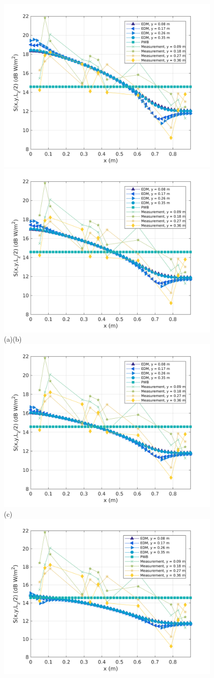 \documentclass[a4paper]{article}
\numberwithin{equation}{section}
\begin{document}
\begin{figure}[hp]
\begin{center}
\includegraphics[width=0.49\linewidth]{figures/SDM_3D_SL_PowerDensityProfileXMeas_JX_k0_5}
\includegraphics[width=0.49\linewidth]{figures/SDM_3D_SL_PowerDensityProfileXMeas_JX_k0_75}\\
{\footnotesize (a)\hspace{75mm}(b)}\\
\includegraphics[width=0.5\linewidth]{figures/SDM_3D_SL_PowerDensityProfileXMeas_JX_k1_0}\\
{\footnotesize (c)}\\
\includegraphics[width=0.49\linewidth]{figures/SDM_3D_SL_PowerDensityProfileXMeas_JX_k1_5}

\end{center}
\end{figure}
\end{document}
